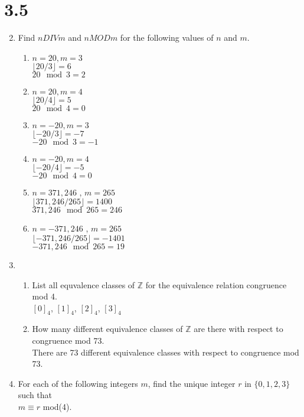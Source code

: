 \documentclass[11pt]{article}
\newcommand{\Z}{\mathbb{Z}}
\begin{document}
\section*{3.5}
\begin{enumerate}
\setcounter{enumi}{1}
\item Find $n DIV m$ and $n MOD m$ for the following values of $n$ and $m$.
	\begin{enumerate}
	\item $n=20,m=3$\\
	$\lfloor20/3\rfloor=6$\\$20\mod3=2$
	\item $n=20,m=4$\\
	$\lfloor20/4\rfloor=5$\\$20\mod4=0$
	\item $n=-20,m=3$\\
	$\lfloor-20/3\rfloor=-7$\\$-20\mod3=-1$
	\item $n=-20,m=4$\\
	$\lfloor-20/4\rfloor=-5$\\$-20\mod4=0$
	\item $n=371,246$ , $m=265$\\	
	$\lfloor371,246/265\rfloor=1400$\\$371,246\mod265=246$
	\item $n=-371,246$ , $m=265$\\	
	$\lfloor-371,246/265\rfloor=-1401$\\$-371,246\mod265=19$
	\end{enumerate}
\setcounter{enumi}{3}
\item 
	\begin{enumerate}
	\item List all equvalence classes of $\Z$ for the equivalence relation congruence mod 4.\\
	$[0]_4$, $[1]_4$, $[2]_4$, $[3]_4$
	\item How many different equivalence classes of $\Z$ are there with respect to \\congruence mod 73.\\
	There are 73 different equivalence classes with respect to congruence mod 73.
	\end{enumerate}
\item For each of the following integers $m$, find the unique integer $r$ in $\{0,1,2,3\}$ such that \\$m\equiv r$ mod(4).
	\begin{enumerate}

\end{enumerate}
\end{enumerate}
\end{document}

